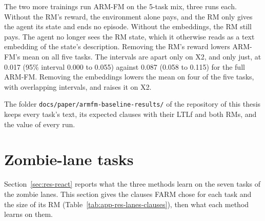 \documentclass[11pt,english,listoffigures,listoftables]{tfgetsinf}
\begin{document}
The two more trainings run ARM-FM on the 5-task mix, three runs each. Without the RM's reward, the environment alone pays, and the RM only gives the agent its state and ends no episode. Without the embeddings, the RM still pays. The agent no longer sees the RM state, which it otherwise reads as a text embedding of the state's description. Removing the RM's reward lowers ARM-FM's mean on all five tasks. The intervals are apart only on X2, and only just, at 0.017 (95\% interval 0.000 to 0.055) against 0.087 (0.058 to 0.115) for the full ARM-FM. Removing the embeddings lowers the mean on four of the five tasks, with overlapping intervals, and raises it on X2.

The folder \texttt{docs/paper/armfm-baseline-results/} of the repository of this thesis keeps every task's text, its expected clauses with their LTLf and both RMs, and the value of every run.

\section{Zombie-lane tasks}
\label{app:res-lanes}

Section~\ref{sec:res-react} reports what the three methods learn on the seven tasks of the zombie lanes. This section gives the clauses FARM chose for each task and the size of its RM (Table~\ref{tab:app-res-lanes-clauses}), then what each method learns on them.
\end{document}
